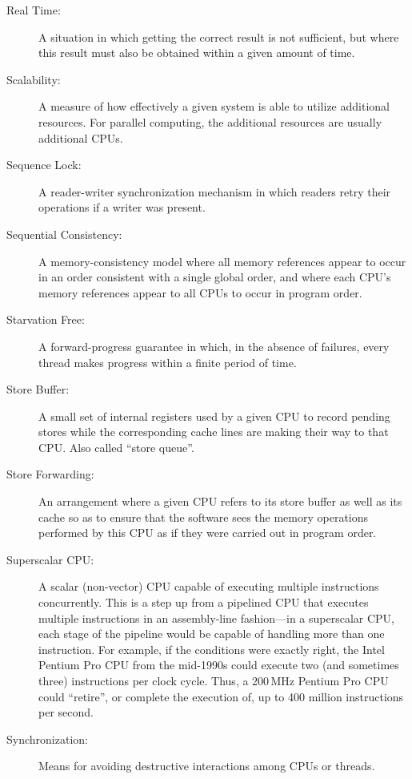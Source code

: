 \begin{description}
\fi

\item[Real Time:]
	A situation in which getting the correct result is not sufficient,
	but where this result must also be obtained within a given amount
	of time.
\item[Scalability:]
	A measure of how effectively a given system is able to utilize
	additional resources.
	For parallel computing, the additional resources are usually
	additional CPUs.
\item[Sequence Lock:]
	A reader-writer synchronization mechanism in which readers
	retry their operations if a writer was present.
\item[Sequential Consistency:]
	A memory-consistency model where all memory references appear to occur
	in an order consistent with
	a single global order, and where each CPU's memory references
	appear to all CPUs to occur in program order.
\item[Starvation Free:]
	A forward-progress guarantee in which, in the absence of
	failures, every thread makes progress within a finite
	period of time.
\item[Store Buffer:]
	A small set of internal registers used by a given CPU
	to record pending stores
	while the corresponding cache lines are making their
	way to that CPU\@.
	Also called ``store queue''.
\item[Store Forwarding:]
	An arrangement where a given CPU refers to its store buffer
	as well as its cache so as to ensure that the software sees
	the memory operations performed by this CPU as if they
	were carried out in program order.
\item[Superscalar CPU:]
	A scalar (non-vector) CPU capable of executing multiple instructions
	concurrently.
	This is a step up from a pipelined CPU that executes multiple
	instructions in an assembly-line fashion---in a superscalar
	CPU, each stage of the pipeline would be capable of handling
	more than one instruction.
	For example, if the conditions were exactly right,
	the Intel Pentium Pro CPU from the mid-1990s could
	execute two (and sometimes three) instructions per clock cycle.
	Thus, a 200\,MHz Pentium Pro CPU could ``retire'', or complete the
	execution of, up to 400 million instructions per second.
\item[Synchronization:]
	Means for avoiding destructive interactions among CPUs or threads.

\end{description}
